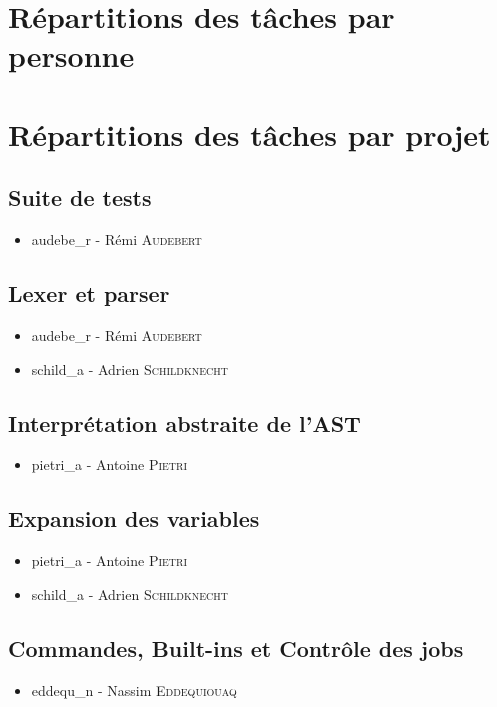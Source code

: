 \section{Répartitions des tâches par personne}







\section{Répartitions des tâches par projet}

\subsection{Suite de tests}

\begin{itemize}
    \item audebe\_r - Rémi \textsc{Audebert}
\end{itemize}

\subsection{Lexer et parser}

\begin{itemize}
    \item audebe\_r - Rémi \textsc{Audebert}
    \item schild\_a - Adrien \textsc{Schildknecht}
\end{itemize}

\subsection{Interprétation abstraite de l'AST}

\begin{itemize}
    \item pietri\_a - Antoine \textsc{Pietri}
\end{itemize}

\subsection{Expansion des variables}

\begin{itemize}
    \item pietri\_a - Antoine \textsc{Pietri}
    \item schild\_a - Adrien \textsc{Schildknecht}
\end{itemize}

\subsection{Commandes, Built-ins et Contrôle des jobs}

\begin{itemize}
    \item eddequ\_n - Nassim \textsc{Eddequiouaq}
\end{itemize}
